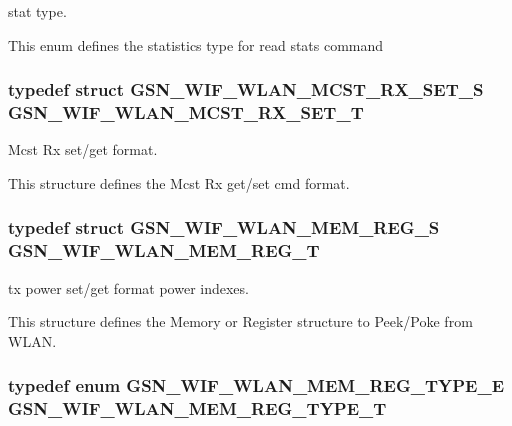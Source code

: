 stat type. 

This enum defines the statistics type for read stats command \hypertarget{a00677_ga1c35c53aa2b78b1856a8fe1233b8368e}{
\subsubsection[{GSN\_\-WIF\_\-WLAN\_\-MCST\_\-RX\_\-SET\_\-T}]{\setlength{\rightskip}{0pt plus 5cm}typedef struct {\bf GSN\_\-WIF\_\-WLAN\_\-MCST\_\-RX\_\-SET\_\-S}  {\bf GSN\_\-WIF\_\-WLAN\_\-MCST\_\-RX\_\-SET\_\-T}}}
\label{a00677_ga1c35c53aa2b78b1856a8fe1233b8368e}


Mcst Rx set/get format. 

This structure defines the Mcst Rx get/set cmd format. \hypertarget{a00677_ga9d8aade166418018f4e609e679f7c603}{
\subsubsection[{GSN\_\-WIF\_\-WLAN\_\-MEM\_\-REG\_\-T}]{\setlength{\rightskip}{0pt plus 5cm}typedef struct {\bf GSN\_\-WIF\_\-WLAN\_\-MEM\_\-REG\_\-S}  {\bf GSN\_\-WIF\_\-WLAN\_\-MEM\_\-REG\_\-T}}}
\label{a00677_ga9d8aade166418018f4e609e679f7c603}


tx power set/get format power indexes. 

This structure defines the Memory or Register structure to Peek/Poke from WLAN. \hypertarget{a00677_gad221ad803b8f2c5c4e24ef1f0c0aa83c}{
\subsubsection[{GSN\_\-WIF\_\-WLAN\_\-MEM\_\-REG\_\-TYPE\_\-T}]{\setlength{\rightskip}{0pt plus 5cm}typedef enum {\bf GSN\_\-WIF\_\-WLAN\_\-MEM\_\-REG\_\-TYPE\_\-E} {\bf GSN\_\-WIF\_\-WLAN\_\-MEM\_\-REG\_\-TYPE\_\-T}}}
\label{a00677_gad221ad803b8f2c5c4e24ef1f0c0aa83c}


